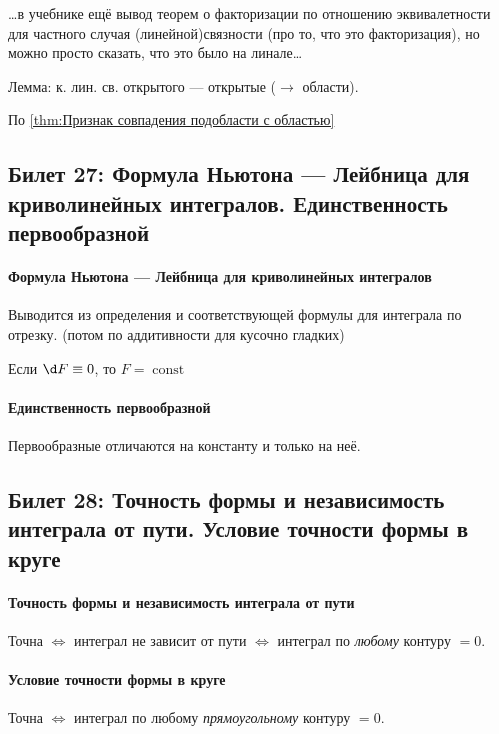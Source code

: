 \documentclass[12pt, a4paper, oneside]{memoir}
\begin{document}
…в учебнике ещё вывод теорем о факторизации по отношению эквивалетности для частного случая (линейной)связности (про то, что это факторизация), 
но можно просто сказать, что это было на линале…

Лемма: к. лин. св. открытого — открытые ($→$ области).

По \ref*{thm:Признак совпадения подобласти с областью} 



\subsection{Билет 27: Формула Ньютона — Лейбница для криволинейных интегралов. Единственность первообразной}

\paragraph{Формула Ньютона — Лейбница для криволинейных интегралов}
Выводится из определения и соответствующей формулы для интеграла по отрезку.
(потом по аддитивности для кусочно гладких)

\begin{corollary}
    Если $\d F \equiv 0$, то $F = \operatorname{const}$
\end{corollary}

\paragraph{Единственность первообразной}
Первообразные отличаются на константу и только на неё.


\subsection{Билет 28: Точность формы и независимость интеграла от пути. Условие точности формы в круге}

\paragraph{Точность формы и независимость интеграла от пути}
Точна $\Leftrightarrow$ интеграл не зависит от пути $\Leftrightarrow$ интеграл по \textit{любому} контуру $= 0$.


\paragraph{Условие точности формы в круге} 
Точна $\Leftrightarrow$ интеграл по любому \textit{прямоугольному} контуру $= 0$.
\end{document}
